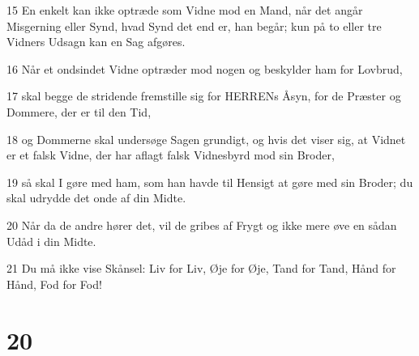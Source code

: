 \par 15 En enkelt kan ikke optræde som Vidne mod en Mand, når det angår Misgerning eller Synd, hvad Synd det end er, han begår; kun på to eller tre Vidners Udsagn kan en Sag afgøres.
\par 16 Når et ondsindet Vidne optræder mod nogen og beskylder ham for Lovbrud,
\par 17 skal begge de stridende fremstille sig for HERRENs Åsyn, for de Præster og Dommere, der er til den Tid,
\par 18 og Dommerne skal undersøge Sagen grundigt, og hvis det viser sig, at Vidnet er et falsk Vidne, der har aflagt falsk Vidnesbyrd mod sin Broder,
\par 19 så skal I gøre med ham, som han havde til Hensigt at gøre med sin Broder; du skal udrydde det onde af din Midte.
\par 20 Når da de andre hører det, vil de gribes af Frygt og ikke mere øve en sådan Udåd i din Midte.
\par 21 Du må ikke vise Skånsel: Liv for Liv, Øje for Øje, Tand for Tand, Hånd for Hånd, Fod for Fod!

\chapter{20}

